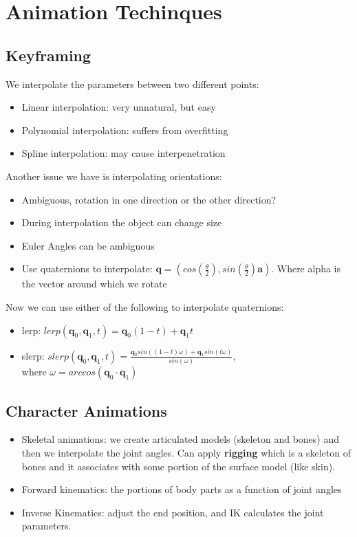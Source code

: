 \documentclass[a4paper]{article}
\begin{document}
\section{Animation Techinques}
\subsection*{Keyframing}
We interpolate the parameters between two different points:
\begin{itemize}
    \item Linear interpolation: very unnatural, but easy
    \item Polynomial interpolation: suffers from overfitting
    \item Spline interpolation: may cause interpenetration
\end{itemize}
Another issue we have is interpolating orientations:
\begin{itemize}
    \item Ambiguous, rotation in one direction or the other direction?
    \item During interpolation the object can change size
    \item Euler Angles can be ambiguous
    \item Use quaternions to interpolate: $\textbf{q} = (cos(\frac{\theta}{2}), sin(\frac{\theta}{2}) \textbf{a} ) $. Where alpha is the vector around which we rotate
\end{itemize}

Now we can use either of the following to interpolate quaternions:
\begin{itemize}
    \item lerp: $lerp(\textbf{q}_0, \textbf{q}_1, t) = \textbf{q}_0 (1-t) + \textbf{q}_1 t$
    \item slerp: $slerp(\textbf{q}_0, \textbf{q}_1, t) = \frac{\textbf{q}_0 sin((1-t)\omega) + \textbf{q}_1 sin(t \omega) }{sin(\omega)}$, \\
    where $\omega = arccos(\textbf{q}_0 \cdot \textbf{q}_1  )$   
\end{itemize}


\subsection{Character Animations}
\begin{itemize}
    \item Skeletal animations: we create articulated models (skeleton and bones) and then we interpolate the joint angles. Can apply \textbf{rigging} which is a skeleton of bones and it associates with some portion of the surface model (like skin).
    \item Forward kinematics: the portions of body parts as a function of joint angles
    \item Inverse Kinematics: adjust the end position, and IK calculates the joint parameters.
\end{itemize}
\end{document}
